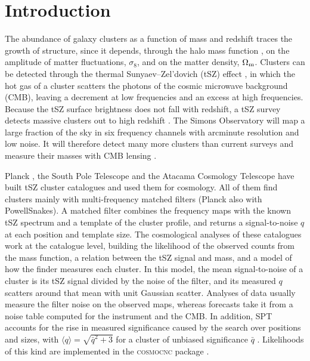 \section{Introduction}\label{sec:intro}

The abundance of galaxy clusters as a function of mass and redshift traces the growth of structure, since
it depends, through the halo mass function \citep[e.g.][]{Tinker2008}, on the amplitude of matter
fluctuations, $\sigma_8$, and on the matter density, $\Omega_\mathrm{m}$. Clusters can be detected through the thermal
Sunyaev--Zel'dovich (tSZ) effect \citep{SZ1972}, in which the hot gas of a cluster scatters the photons of
the cosmic microwave background (CMB), leaving a decrement at low frequencies and an excess at high
frequencies. Because the tSZ surface brightness does not fall with redshift, a tSZ survey detects massive
clusters out to high redshift \citep{Carlstrom2002}. The Simons Observatory \citep[SO;][]{SO2019} will map
a large fraction of the sky in six frequency channels with arcminute resolution and low noise. It will therefore detect many more clusters than current surveys and measure their masses with CMB lensing
\citep{MelinBartlett2015,Madhavacheril2017}.

Planck \citep{Planck2016XXVII,Planck2016XXIV}, the South Pole Telescope \citep[SPT;][]{Bocquet2019,
Bocquet2024} and the Atacama Cosmology Telescope \citep[ACT;][]{Hasselfield2013,Hilton2021} have built tSZ
cluster catalogues and used them for cosmology. All of them find clusters mainly with multi-frequency
matched filters \citep{Herranz2002,Melin2006} (Planck also with PowellSnakes). A matched filter combines
the frequency maps with the known tSZ spectrum and a template of the cluster profile, and returns a
signal-to-noise $q$ at each position and template size. The cosmological analyses of these catalogues work at the catalogue
level, building the likelihood of the observed counts from the mass function, a relation between the tSZ
signal and mass, and a model of how the finder measures each cluster. In this model, the mean
signal-to-noise of a cluster is its tSZ signal divided by the noise of the filter, and its measured $q$
scatters around that mean with unit Gaussian scatter. Analyses of data usually measure the filter noise
on the observed maps, whereas forecasts take it from a noise table computed for the instrument and the
CMB. In addition, SPT accounts for the rise in measured significance caused by the search over positions
and sizes, with $\langle q\rangle=\sqrt{\bar q^2+3}$ for a cluster of unbiased significance $\bar q$
\citep{Vanderlinde2010}. Likelihoods of this kind are implemented in the \textsc{cosmocnc} package
\citep{ZubeldiaBolliet2024}.

